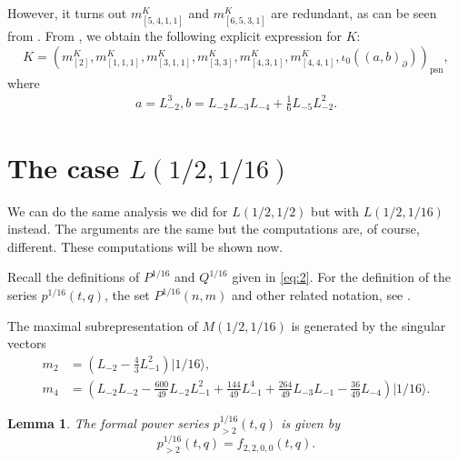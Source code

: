 \documentclass[12pt, reqno]{amsart}
\newtheorem{lemma}[theorem]{Lemma}
\theoremstyle{remark}
\DeclareMathOperator{\psn}{psn}
\newcommand{\vacsixteen}{|1/16\rangle}
\begin{document}
However, it turns out $m^K_{[5, 4, 1, 1]}$ and $m^K_{[6, 5, 3, 1]}$ are redundant, as can be seen from \cite[m11-m15.ipynb]{sagemath2}.
From \cite[Theorem 2]{andrews_singular_2022}, we obtain the following explicit expression for $K$:
\begin{equation*}
  K = (m^K_{[2]}, m^K_{[1, 1, 1]}, m^K_{[3, 1, 1]}, m^K_{[3, 3]}, m^K_{[4, 3, 1]}, m^K_{[4, 4, 1]}, \iota_0((a, b)_\partial))_{\psn},
\end{equation*}
where
\begin{align*}
  a = L_{-2}^3, b = L_{-2}L_{-3}L_{-4} + \tfrac{1}{6}L_{-5}L_{-2}^2.
\end{align*}

\section{The case $L(1/2, 1/16)$}
\label{sec:case-l12-116}

We can do the same analysis we did for $L(1/2, 1/2)$ but with $L(1/2, 1/16)$ instead.
The arguments are the same but the computations are, of course, different.
These computations will be shown now.

Recall the definitions of $P^{1/16}$ and $Q^{1/16}$ given in \eqref{eq:2}.
For the definition of the series $p^{1/16}(t, q)$, the set $P^{1/16}(n, m)$ and other related notation, see .

The maximal subrepresentation of $M(1/2, 1/16)$ is generated by the singular vectors
\begin{align*}
  m_2 &= (L_{-2} - \tfrac{4}{3} L_{-1}^2)\vacsixteen, \\
  m_4 &= (L_{-2}L_{-2} - \tfrac{600}{49}L_{-2}L_{-1}^2 + \tfrac{144}{49}L_{-1}^4 + \tfrac{264}{49}L_{-3}L_{-1} - \tfrac{36}{49}L_{-4})\vacsixteen.
\end{align*}

\begin{lemma}
  \label{lmm:12}
  The formal power series $p^{1/16}_{>2}(t, q)$ is given by
  \begin{equation*}
    p^{1/16}_{>2}(t, q) = f_{2, 2, 0, 0}(t, q).
  \end{equation*}
\end{lemma}
\end{document}
